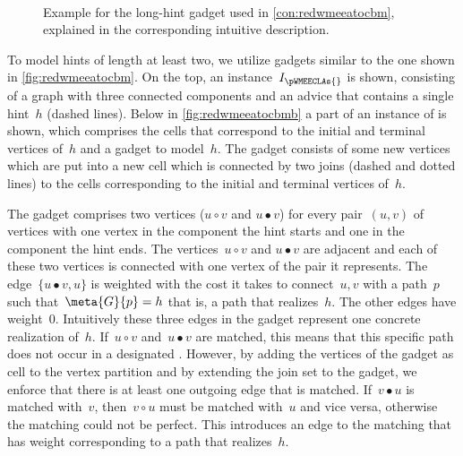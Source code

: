\begin{figure}
  \begin{center}
     \\
    \caption{Example for the long-hint gadget used in \autoref{con:redwmeeatocbm}, explained in the corresponding intuitive description.}
    \label{fig:redwmeeatocbm}
  \end{center}
\end{figure}
To model hints of length at least two, we utilize gadgets similar to the one shown in \autoref{fig:redwmeeatocbm}. On the top, an instance~$I_\pWMEECLAs{}$ is shown, consisting of a graph with three connected components and an advice that contains a single hint~$h$ (dashed lines). Below in \autoref{fig:redwmeeatocbmb} a part of an instance of \pCBMs{} is shown, which comprises the cells that correspond to the initial and terminal vertices of~$h$ and a gadget to model~$h$. The gadget consists of some new vertices which are put into a new cell which is connected by two joins (dashed and dotted lines) to the cells corresponding to the initial and terminal vertices of~$h$.

The gadget comprises two vertices ($u \circ v$ and $ u \bullet v$) for every pair~$(u, v)$ of vertices with one vertex in the component the hint starts and one in the component the hint ends. The vertices~$u \circ v$ and $u \bullet v$ are adjacent and each of these two vertices is connected with one vertex of the pair it represents. The edge~$\{u \bullet v, u\}$ is weighted with the cost it takes to connect~$u, v$ with a path~$p$ such that~$\meta{G}{p}=h$ that is, a path that realizes~$h$. The other edges have weight~$0$. Intuitively these three edges in the gadget represent one concrete realization of~$h$. If~$u \circ v$ and~$u \bullet v$ are matched, this means that this specific path does not occur in a designated \EE{}. However, by adding the vertices of the gadget as cell to the vertex partition and by extending the join set to the gadget, we enforce that there is at least one outgoing edge that is matched. If~$v \bullet u$ is matched with~$v$, then~$v \circ u$ must be matched with~$u$ and vice versa, otherwise the matching could not be perfect. This introduces an edge to the matching that has weight corresponding to a path that realizes~$h$.

